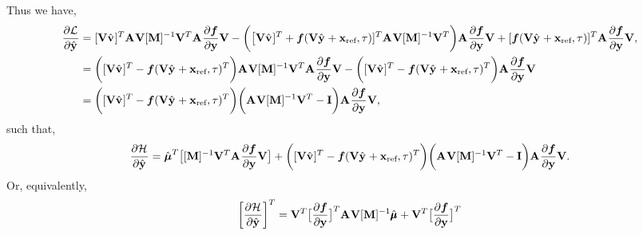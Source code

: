 \documentclass[3p,computermodern,10pt]{elsarticle}
\begin{document}
\begin{appendices}
$$$$
Thus we have,
\begin{align*}
\frac{\partial \mathcal{L}^{}}{\partial \hat{\mathbf{y}}^{}} &= 
[\mathbf {V} \hat{\mathbf{v}}^{} ]^T   \mathbf{A}^{}   \mathbf {V}  [\mathbf{M}]^{-1}\mathbf {V}^T
\mathbf{A}^{} \frac{\partial \boldsymbol f}{\partial \mathbf{y}} \mathbf {V} -
\bigg( \big[ \mathbf {V} \hat{\mathbf{v}}^{} ]^T  + \boldsymbol f(\mathbf {V} \hat{\mathbf{y}}^{} + \mathbf{x}_\text{ref},\tau)]^T  \mathbf{A}^{} \mathbf {V} [\mathbf{M}]^{-1} \mathbf {V}^T  \bigg) \mathbf{A}^{} \frac{\partial \boldsymbol f}{\partial \mathbf{y}} \mathbf {V} + 
 [\boldsymbol f(\mathbf {V} \hat{\mathbf{y}}^{} + \mathbf{x}_\text{ref},\tau) ]^T  \mathbf{A}^{} \frac{\partial \boldsymbol f}{\partial \mathbf{y}} \mathbf {V}, \\
&= 
\bigg( [\mathbf {V} \hat{\mathbf{v}}^{} ]^T - \boldsymbol f(\mathbf {V} \hat{\mathbf{y}}^{} + \mathbf{x}_\text{ref},\tau)^T \bigg)  \mathbf{A}^{}   \mathbf {V}  [\mathbf{M}]^{-1}\mathbf {V}^T
\mathbf{A}^{} \frac{\partial \boldsymbol f}{\partial \mathbf{y}} \mathbf {V} -
\bigg( [\mathbf {V} \hat{\mathbf{v}}^{} ]^T - \boldsymbol f(\mathbf {V} \hat{\mathbf{y}}^{} + \mathbf{x}_\text{ref},\tau)^T \bigg)  \mathbf{A}^{}
\frac{\partial \boldsymbol f}{\partial \mathbf{y}} \mathbf {V} \\ 
&= 
\bigg( [\mathbf {V} \hat{\mathbf{v}}^{} ]^T - \boldsymbol f(\mathbf {V} \hat{\mathbf{y}}^{} + \mathbf{x}_\text{ref},\tau)^T \bigg)   \bigg( \mathbf{A}^{} \mathbf {V}  [\mathbf{M}]^{-1}\mathbf {V}^T - \mathbf{I} \bigg)
\mathbf{A}^{} \frac{\partial \boldsymbol f}{\partial \mathbf{y}} \mathbf {V}, 
\end{align*}
such that,
\begin{equation*}
\frac{\partial \mathcal{H}^{}}{\partial \hat{\mathbf{y}}^{}{}} = 
  \hat{\boldsymbol \mu}^{T} \big[  [\mathbf{M}]^{-1}\mathbf {V}^T \mathbf{A}^{}  \frac{\partial \boldsymbol f}{\partial \mathbf{y}}\mathbf {V}  \big]  + 
\bigg( [\mathbf {V} \hat{\mathbf{v}}^{} ]^T - \boldsymbol f(\mathbf {V} \hat{\mathbf{y}}^{} + \mathbf{x}_\text{ref},\tau)^T \bigg)   \bigg( \mathbf{A}^{} \mathbf {V}  [\mathbf{M}]^{-1}\mathbf {V}^T - \mathbf{I} \bigg)
\mathbf{A}^{} \frac{\partial \boldsymbol f}{\partial \mathbf{y}} \mathbf {V}.
\end{equation*}
Or, equivalently,
\begin{equation*}
\bigg[ \frac{\partial \hamiltonianArg{}}{\partial \genstateyDiscreteArgnt{}{}} \bigg]^T =  \basisspace^T \big[  \frac{\partial \velocity}{\partial \stateyDiscrete} \big]^T \stweightingMatArg{}  \basisspace [\massArgnt{}]^{-1}  \adjointDiscreteDumArgnt{} + 
 \basisspace^T \big[  \frac{\partial \velocity}{\partial \stateyDiscrete} \big]^T 

\end{equation*}
\end{appendices}
\end{document}
